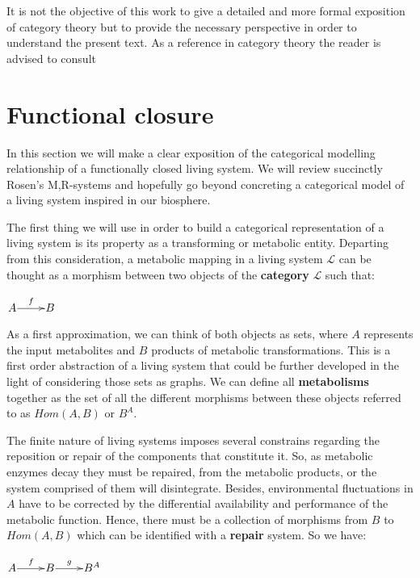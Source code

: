 \documentclass[aps,twocolumn]{revtex4-1}
\begin{document}
It is not the objective of this work to give a detailed and more formal exposition of category theory but to provide the necessary perspective in order to understand the present text. As a reference in category theory the reader is advised to consult

\section{Functional closure}

In this section we will make a clear exposition of the categorical modelling relationship of a functionally closed living system. We will review succinctly Rosen's M,R-systems and hopefully go beyond concreting a categorical model of a living system inspired in our biosphere.

The first thing we will use in order to build a categorical representation of a living system is its property as a transforming or metabolic entity. Departing from this consideration, a metabolic mapping in a living system $\mathcal{L}$ can be thought as a morphism between two objects of the \textbf{category} $\mathcal{L}$ such that:

\begin{center}
	$\xymatrix@1{
	A\ar[r]^-{f} & B
	}$

\end{center}

As a first approximation, we can think of both objects as sets, where $A$ represents the input metabolites and $B$  products of metabolic transformations. This is a first order abstraction of a living system that could be further developed in the light of considering those sets as graphs. We can define all \textbf{metabolisms} together as the set of all the different morphisms between these objects referred to as $Hom(A,B)$ or $B^A$.

The finite nature of living systems imposes several constrains regarding the reposition or repair of the components that constitute it. So, as metabolic enzymes decay they must be repaired, from the metabolic products, or the system comprised of them will disintegrate. Besides, environmental fluctuations in $A$ have to be corrected by the differential availability and performance of the metabolic function. Hence, there must be a collection of morphisms from $B$ to $Hom(A,B)$ which can be identified with a \textbf{repair} system. So we have:


\begin{center}
	$
	\xymatrix@1{
	A\ar[r]^f &B\ar[r]^-g & B^A}
	$
\end{center}
\end{document}
